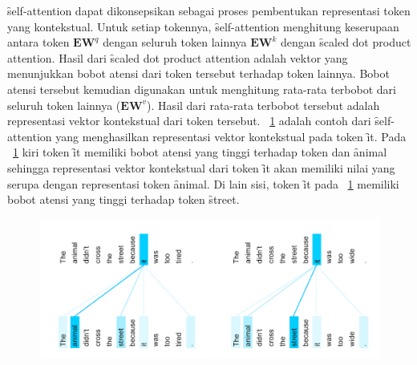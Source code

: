 	\f{self-attention} dapat dikonsepsikan sebagai proses pembentukan representasi token yang kontekstual. Untuk setiap tokennya, \f{self-attention} menghitung keserupaan antara token $\mathbf{E}\mathbf{W}^q$ dengan seluruh token lainnya $\mathbf{E} \mathbf{W}^k$ dengan \f{scaled dot product attention}. Hasil dari \f{scaled dot product attention} adalah vektor yang menunjukkan bobot atensi dari token tersebut terhadap token lainnya. Bobot atensi tersebut kemudian digunakan untuk menghitung rata-rata terbobot dari seluruh token lainnya ($\mathbf{E} \mathbf{W}^v$). Hasil dari rata-rata terbobot tersebut adalah representasi vektor kontekstual dari token tersebut. \pic~\ref{fig:self-attention-example} adalah contoh dari \f{self-attention} yang menghasilkan representasi vektor kontekstual pada token \f{it}. Pada \pic~\ref{fig:self-attention-example} kiri token \f{it} memiliki bobot atensi yang tinggi terhadap token dan \f{animal} sehingga representasi vektor kontekstual dari token \f{it} akan memiliki nilai yang serupa dengan representasi token \f{animal}. Di lain sisi, token \f{it} pada \pic~\ref{fig:self-attention-example} memiliki bobot atensi yang tinggi terhadap token \f{street}.
	\begin{figure}
		\centering
		\includegraphics[width=1\textwidth]{assets/pics/self-attn-example.png}
		\label{fig:self-attention-example}
	\end{figure}
	
